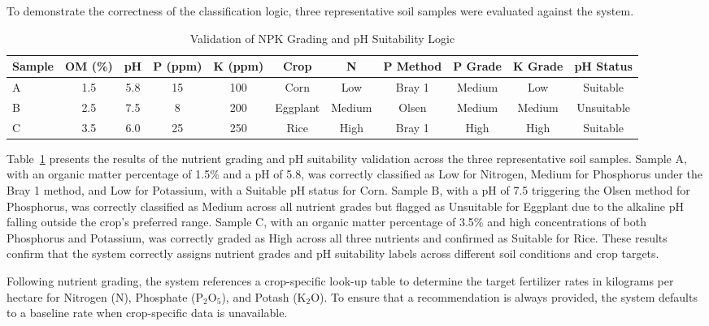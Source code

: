 {	To demonstrate the correctness of the classification logic, three representative soil samples were evaluated against the system.
	
	\begin{table}[H]
		\centering
		\caption{Validation of NPK Grading and pH Suitability Logic}
		\label{tab:npk_validation_samples}
		\renewcommand{\arraystretch}{1.1}
		\begin{adjustbox}{max width=\textwidth}
			\begin{tabular}{lcccccccccc}
				\toprule
				Sample & OM (\%) & pH & P (ppm) & K (ppm) & Crop & N & P Method & P Grade & K Grade & pH Status \\
				\midrule
				A & 1.5 & 5.8 & 15 & 100 & Corn & Low & Bray 1 & Medium & Low & Suitable \\
				B & 2.5 & 7.5 & 8 & 200 & Eggplant & Medium & Olsen & Medium & Medium & Unsuitable \\
				C & 3.5 & 6.0 & 25 & 250 & Rice & High & Bray 1 & High & High & Suitable \\
				\bottomrule
			\end{tabular}
		\end{adjustbox}
	\end{table}
	
	Table~\ref{tab:npk_validation_samples} presents the results of the nutrient grading and pH suitability validation across the three representative soil samples. Sample A, with an organic matter percentage of 1.5\% and a pH of 5.8, was correctly classified as Low for Nitrogen, Medium for Phosphorus under the Bray 1 method, and Low for Potassium, with a Suitable pH status for Corn. Sample B, with a pH of 7.5 triggering the Olsen method for Phosphorus, was correctly classified as Medium across all nutrient grades but flagged as Unsuitable for Eggplant due to the alkaline pH falling outside the crop's preferred range. Sample C, with an organic matter percentage of 3.5\% and high concentrations of both Phosphorus and Potassium, was correctly graded as High across all three nutrients and confirmed as Suitable for Rice. These results confirm that the system correctly assigns nutrient grades and pH suitability labels across different soil conditions and crop targets.
	
	Following nutrient grading, the system references a crop-specific look-up table to determine the target fertilizer rates in kilograms per hectare for Nitrogen (N), Phosphate (P$_2$O$_5$), and Potash (K$_2$O). To ensure that a recommendation is always provided, the system defaults to a baseline rate when crop-specific data is unavailable.
	
}
